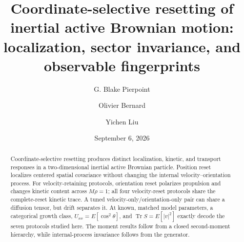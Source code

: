 \documentclass[aps,pre,amsmath,amssymb,nofootinbib]{revtex4-2}
\begin{document}
\title{Coordinate-selective resetting of inertial active Brownian motion: localization, sector invariance, and observable fingerprints}
\author{G. Blake Pierpoint}
\author{Olivier Bernard}
\author{Yichen Liu}
\date{September 6, 2026}
\begin{abstract}
Coordinate-selective resetting produces distinct localization, kinetic, and transport responses in a two-dimensional inertial active Brownian particle. Position reset localizes centered spatial covariance without changing the internal velocity--orientation process. For velocity-retaining protocols, orientation reset polarizes propulsion and changes kinetic content across $M\rho=1$; all four velocity-reset protocols share the complete-reset kinetic trace. A tuned velocity-only/orientation-only pair can share a diffusion tensor, but drift separates it. At known, matched model parameters, a categorical growth class, $U_{xx}=E[\cos^2\theta]$, and $\operatorname{Tr}S=E[|v|^2]$ exactly decode the seven protocols studied here. The moment results follow from a closed second-moment hierarchy, while internal-process invariance follows from the generator.
\end{abstract}
\maketitle

\end{document}
